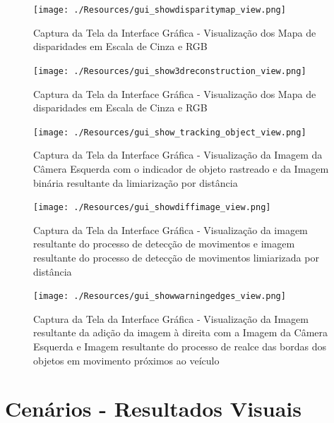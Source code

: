 \begin{figure}[H]
 	\centering
 	\texttt{[image: ./Resources/gui\_showdisparitymap\_view.png]}
 	\caption{Captura da Tela da Interface Gráfica - Visualização dos Mapa de disparidades em Escala de Cinza e RGB}
 	\label{gui_showdisparitymap_view}
\end{figure}


\begin{figure}[H]
 	\centering
 	\texttt{[image: ./Resources/gui\_show3dreconstruction\_view.png]}
 	\caption{Captura da Tela da Interface Gráfica - Visualização dos Mapa de disparidades em Escala de Cinza e RGB}
 	\label{gui_show3dreconstruction_view}
\end{figure}


\begin{figure}[H]
 	\centering
 	\texttt{[image: ./Resources/gui\_show\_tracking\_object\_view.png]}
 	\caption{Captura da Tela da Interface Gráfica - Visualização da Imagem da Câmera Esquerda com o indicador de objeto rastreado e da Imagem binária resultante da limiarização por distância}
 	\label{gui_show_tracking_object_view}
\end{figure}


\begin{figure}[H]
 	\centering
 	\texttt{[image: ./Resources/gui\_showdiffimage\_view.png]}
 	\caption{Captura da Tela da Interface Gráfica - Visualização da imagem resultante do processo de detecção de movimentos e imagem resultante do processo de detecção de movimentos limiarizada por distância}
 	\label{gui_showdiffimage_view}
\end{figure}


\begin{figure}[H]
 	\centering
 	\texttt{[image: ./Resources/gui\_showwarningedges\_view.png]}
 	\caption{Captura da Tela da Interface Gráfica - Visualização da Imagem resultante da adição da imagem à direita com a Imagem da Câmera Esquerda e Imagem resultante do processo de realce das bordas dos 
 	objetos em movimento próximos ao veículo}
 	\label{gui_showwarningedges_view}
\end{figure}


\section{Cenários - Resultados Visuais}
\label{resultsScenes}

